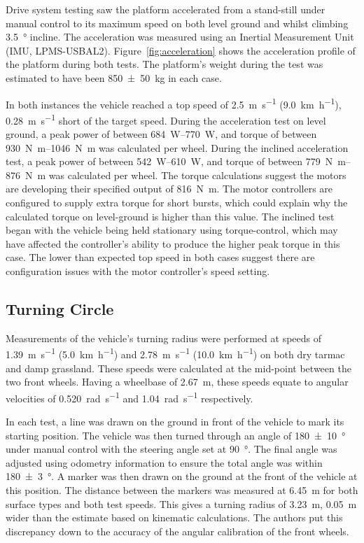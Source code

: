 \documentclass[preprint,authoryear,12pt]{elsarticle}
\begin{document}
    Drive system testing saw the platform accelerated from a stand-still under manual control to its maximum speed on both level ground and whilst climbing \SI{3.5}{\degree} incline.
    The acceleration was measured using an Inertial Measurement Unit (IMU, LPMS-USBAL2).
    Figure~\ref{fig:acceleration} shows the acceleration profile of the platform during both tests.
    The platform's weight during the test was estimated to have been \SI[separate-uncertainty=true]{850(50)}{\kilo\gram} in each case.

    In both instances the vehicle reached a top speed of \SI{2.5}{\meter\per\second} (\SI{9.0}{\kilo\meter\per\hour}), \SI{0.28}{\meter\per\second} short of the target speed.
    During the acceleration test on level ground, a peak power of between \SIrange{684}{770}{\watt}, and torque of between \SIrange{930}{1046}{\newton\meter} was calculated per wheel.
    During the inclined acceleration test, a peak power of between \SIrange{542}{610}{\watt}, and torque of between \SIrange{779}{876}{\newton\meter} was calculated per wheel.
    The torque calculations suggest the motors are developing their specified output of \SI{816}{\newton\meter}.
    The motor controllers are configured to supply extra torque for short bursts, which could explain why the calculated torque on level-ground is higher than this value.
    The inclined test began with the vehicle being held stationary using torque-control, which may have affected the controller's ability to produce the higher peak torque in this case.
    The lower than expected top speed in both cases suggest there are configuration issues with the motor controller's speed setting.

  \subsection{Turning Circle}

    Measurements of the vehicle's turning radius were performed at speeds of \SI{1.39}{\meter\per\second} (\SI{5.0}{\kilo\meter\per\hour}) and \SI{2.78}{\meter\per\second} (\SI{10.0}{\kilo\meter\per\hour}) on both dry tarmac and damp grassland.
    These speeds were calculated at the mid-point between the two front wheels.
    Having a wheelbase of \SI{2.67}{\meter}, these speeds equate to angular velocities of \SI{0.520}{\radian\per\second} and \SI{1.04}{\radian\per\second} respectively.

    In each test, a line was drawn on the ground in front of the vehicle to mark its starting position.
    The vehicle was then turned through an angle of \SI[separate-uncertainty=true]{180(10)}{\degree} under manual control with the steering angle set at \SI{90}{\degree}.
    The final angle was adjusted using odometry information to ensure the total angle was within \SI[separate-uncertainty=true]{180(3)}{\degree}.
    A marker was then drawn on the ground at the front of the vehicle at this position.
    The distance between the markers was measured at \SI{6.45}{\meter} for both surface types and both test speeds.
    This gives a turning radius of \SI{3.23}{\meter}, \SI{0.05}{\meter} wider than the estimate based on kinematic calculations.
    The authors put this discrepancy down to the accuracy of the angular calibration of the front wheels.
\end{document}

